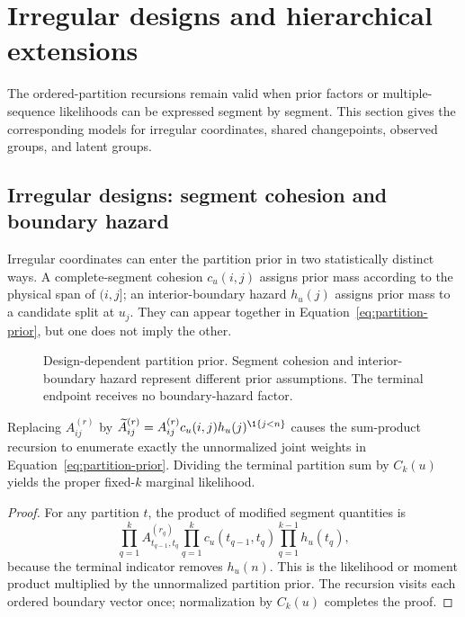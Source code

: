 \section{Irregular designs and hierarchical extensions}
\label{sec:extensions}

The ordered-partition recursions remain valid when prior factors or multiple-sequence likelihoods can be expressed segment by segment. This section gives the corresponding models for irregular coordinates, shared changepoints, observed groups, and latent groups.

\subsection{Irregular designs: segment cohesion and boundary hazard}
Irregular coordinates can enter the partition prior in two statistically distinct ways. A complete-segment cohesion $c_u(i,j)$ assigns prior mass according to the physical span of $(i,j]$; an interior-boundary hazard $h_u(j)$ assigns prior mass to a candidate split at $u_j$. They can appear together in Equation~\eqref{eq:partition-prior}, but one does not imply the other.

\begin{figure}[t]
  \centering
  \resizebox{0.96\columnwidth}{!}{}
  \caption{Design-dependent partition prior. Segment cohesion and interior-boundary hazard represent different prior assumptions. The terminal endpoint receives no boundary-hazard factor.}
  \label{fig:cohesion-hazard-paper}
\end{figure}

\begin{theorem}
\label{thm:local-prior-paper}
Replacing $A^{(r)}_{ij}$ by
$\widetilde A^{(r)}_{ij}=A^{(r)}_{ij}c_u(i,j)h_u(j)^{\1\{j<n\}}$
causes the sum-product recursion to enumerate exactly the unnormalized joint weights in Equation~\eqref{eq:partition-prior}. Dividing the terminal partition sum by $C_k(u)$ yields the proper fixed-$k$ marginal likelihood.
\end{theorem}
\begin{proof}
For any partition $t$, the product of modified segment quantities is
\[
\prod_{q=1}^{k}A^{(r_q)}_{t_{q-1},t_q}
\prod_{q=1}^{k}c_u(t_{q-1},t_q)
\prod_{q=1}^{k-1}h_u(t_q),
\]
because the terminal indicator removes $h_u(n)$. This is the likelihood or moment product multiplied by the unnormalized partition prior. The recursion visits each ordered boundary vector once; normalization by $C_k(u)$ completes the proof.
\end{proof}


